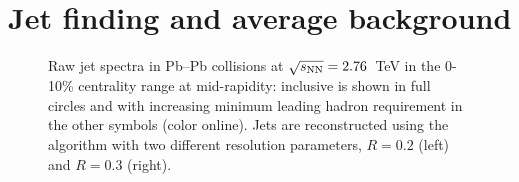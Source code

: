 \documentclass[a4paper]{jpconf}
\begin{document}
\section{Jet finding and average background}
\begin{figure}[t]
\centering
{} \quad
{} 
\caption{Raw jet \pT{} spectra in \mbox{Pb--Pb} collisions at $\sqrt{s_{\rm NN}}=2.76$~TeV in the 0-10\% centrality range at mid-rapidity:
inclusive is shown in full circles and with 
increasing minimum leading hadron \pT{} requirement in the other symbols (color online). Jets are reconstructed using the \antikt{} algorithm 
with two different resolution parameters, $R=0.2$ (left) and $R=0.3$ (right).}
\label{fig:RawJetSpectraPt}
\end{figure}
\end{document}
